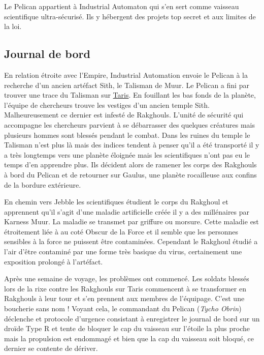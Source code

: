 Le Pelican appartient à Industrial Automaton qui s’en sert comme vaisseau scientifique ultra-sécurisé. Ils y hébergent des projets top secret et aux limites de la loi.

\subsection{Journal de bord}
\label{sec:pelican-jdb}
En relation étroite avec l’Empire, Industrial Automation envoie le Pelican à la recherche d’un ancien artéfact Sith, le Talisman de Muur. Le Pelican a fini par trouver une trace du Talisman sur \href{http://fr.starwars.wikia.com/wiki/Taris}{Taris}. En fouillant les bas fonds de la planète, l’équipe de chercheurs trouve les vestiges d'un ancien temple Sith. Malheureusement ce dernier est infesté de Rakghouls. L’unité de sécurité qui accompagne les chercheurs parvient à se débarrasser des quelques créatures mais plusieurs hommes sont blessés pendant le combat. Dans les ruines du temple le Talisman n’est plus là mais des indices tendent à penser qu’il a été transporté il y a très longtemps vers une planète éloignée mais les scientifiques n'ont pas eu le temps d'en apprendre plus. Ils décident alors de ramener les corps des Rakghouls à bord du Pelican et de retourner sur Gaulus, une planète rocailleuse aux confins de la bordure extérieure.

En chemin vers Jebble les scientifiques étudient le corps du Rakghoul et apprennent qu’il s’agit d’une maladie artificielle créée il y a des millénaires par Karness Muur. La maladie se transmet par griffure ou morsure. Cette maladie est étroitement liée à au coté Obscur de la Force et il semble que les personnes sensibles à la force ne puissent être contaminées. Cependant le Rakghoul étudié a l’air d’être contaminé par une forme très basique du virus, certainement une exposition prolongé à l’artéfact.

Après une semaine de voyage, les problèmes ont commencé. Les soldats blessés lors de la rixe contre les Rakghouls sur Taris commencent à se transformer en Rakghouls à leur tour et s’en prennent aux membres de l’équipage. C’est une boucherie sans nom ! Voyant cela, le commandant du Pelican (\emph{Tycho Obrin}) déclenche et protocole d’urgence consistant à enregistrer le journal de bord sur un droïde Type R et tente de bloquer le cap du vaisseau sur l’étoile la plus proche mais la propulsion est endommagé et bien que la cap du vaisseau soit bloqué, ce dernier se contente de dériver.

\vspace{10\baselineskip}

